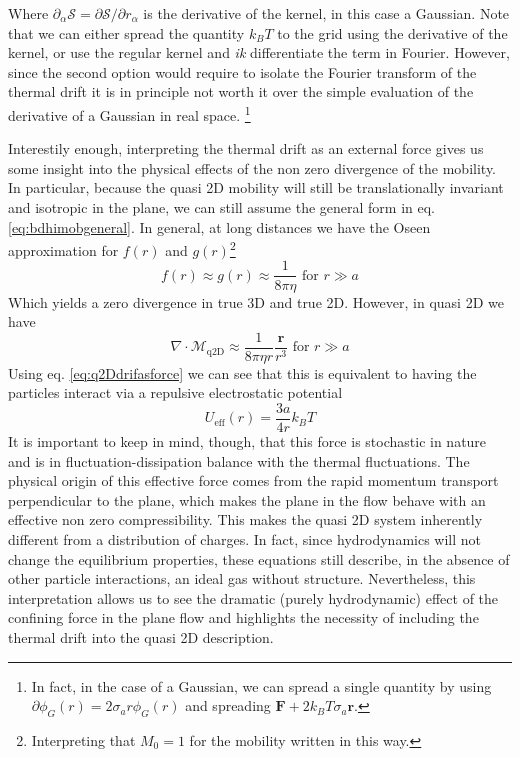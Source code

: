 \documentclass[ twoside,openright,titlepage,numbers=noenddot,%
headinclude,footinclude,cleardoublepage=empty,abstract=on,
BCOR=5mm,paper=a4,fontsize=11pt, dvipsnames
]{scrreprt}
\renewcommand{\vec}[1]{\bm{#1}}
\newcommand{\tens}[1]{\bm{\mathcal{#1}}}
\newcommand{\oper}[1]{\mathcal{#1}}
\newcommand{\kT}{k_B T}
\begin{document}
Where $\partial_\alpha\oper{S} = \partial\oper{S}/\partial r_\alpha$ is the derivative of the kernel, in this case a Gaussian. Note that we can either spread the quantity $\kT$ to the grid using the derivative of the kernel, or use the regular kernel and \emph{ik} differentiate the term in Fourier. However, since the second option would require to isolate the Fourier transform of the thermal drift it is in principle not worth it over the simple evaluation of the derivative of a Gaussian in real space.
\footnote{In fact, in the case of a Gaussian, we can spread a single quantity by using $\partial\phi_G(r) = 2\sigma_ar\phi_G(r)$ and spreading $\vec{F} + 2\kT\sigma_a\vec{r}$.}

Interestily enough, interpreting the thermal drift as an external force gives us some insight into the physical effects of the non zero divergence of the mobility. In particular, because the quasi 2D mobility will still be translationally invariant and isotropic in the plane, we can still assume the general form in eq. \eqref{eq:bdhimobgeneral}. In general, at long distances we have the Oseen approximation for $f(r)$ and $g(r)$\footnote{Interpreting that $M_0=1$ for the mobility written in this way.}
\begin{equation}
  f(r) \approx g(r) \approx \frac{1}{8\pi\eta} \text{ for } r\gg a
\end{equation}
Which yields a zero divergence in true 3D and true 2D. However, in quasi 2D we have
\begin{equation}
  \nabla\cdot\tens{M}_{\text{q2D}} \approx \frac{1}{8\pi\eta r}\frac{\vec{r}}{r^3} \text{ for } r\gg a
\end{equation}
Using eq. \eqref{eq:q2Ddrifasforce} we can see that this is equivalent to having the particles interact via a repulsive electrostatic potential
\begin{equation}
  U_{\text{eff}}(r) = \frac{3a}{4r}\kT
\end{equation}
It is important to keep in mind, though, that this force is stochastic in nature and is in fluctuation-dissipation balance with the thermal fluctuations. The physical origin of this effective force comes from the rapid momentum transport perpendicular to the plane, which makes the plane in the flow behave with an effective non zero compressibility. This makes the quasi 2D system inherently different from a distribution of charges. In fact, since hydrodynamics will not change the equilibrium properties, these equations still describe, in the absence of other particle interactions, an ideal gas without structure. Nevertheless, this interpretation allows us to see the dramatic (purely hydrodynamic) effect of the confining force in the plane flow and highlights the necessity of including the thermal drift into the quasi 2D description.
\end{document}
